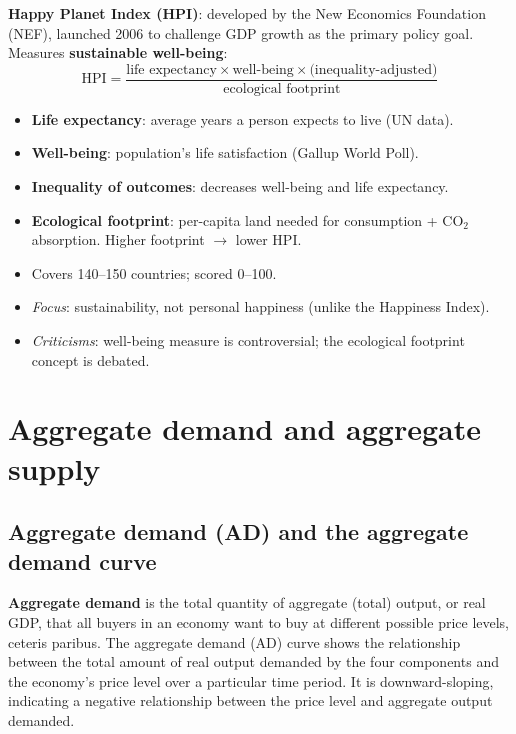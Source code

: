 \documentclass[a4paper,12pt]{article}
\newcommand{\needbold}[1]{\textcolor{red!70!black}{\textbf{#1}}}
\begin{document}
\textbf{Happy Planet Index (HPI)}: developed by the New Economics Foundation (NEF), launched 2006 to challenge GDP growth as the primary policy goal. Measures \textbf{sustainable well-being}:
\[
\text{HPI} = \frac{\text{life expectancy} \times \text{well-being} \times \text{(inequality-adjusted)}}{\text{ecological footprint}}
\]
\begin{itemize}
  \item \textbf{Life expectancy}: average years a person expects to live (UN data).
  \item \textbf{Well-being}: population's life satisfaction (Gallup World Poll).
  \item \textbf{Inequality of outcomes}: decreases well-being and life expectancy.
  \item \textbf{Ecological footprint}: per-capita land needed for consumption + CO$_2$ absorption. Higher footprint $\to$ lower HPI.
  \item Covers 140--150 countries; scored 0--100.
  \item \textit{Focus}: sustainability, not personal happiness (unlike the Happiness Index).
  \item \textit{Criticisms}: well-being measure is controversial; the ecological footprint concept is debated.
\end{itemize}
\section{Aggregate demand and aggregate supply}\label{sec:ad-as}
\subsection{Aggregate demand (AD) and the aggregate demand curve}
\needbold{Aggregate demand} is the total quantity of aggregate (total) output, or real GDP, that all buyers in an economy want to buy at different possible price levels, ceteris paribus.
The aggregate demand (AD) curve shows the relationship between the total amount of real output demanded by the four components and the economy's price level over a particular time period. It is downward-sloping, indicating a negative relationship between the price level and aggregate output demanded.
\end{document}
